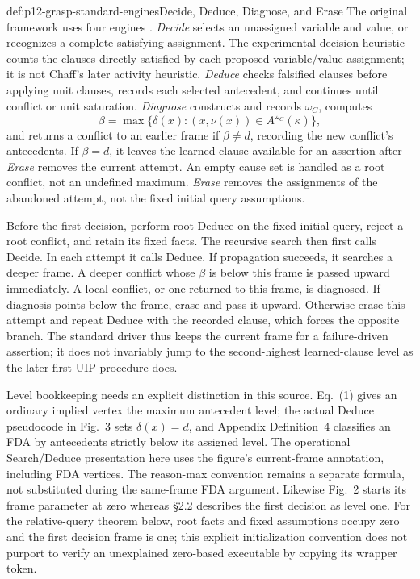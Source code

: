 \begin{hbmethod}{def:p12-grasp-standard-engines}{Decide, Deduce, Diagnose, and Erase}
The original framework uses four engines
\cite[Sec.~2.5; Figs.~2--3, 5]{MarquesSilvaSakallah1999}.
\emph{Decide} selects an unassigned variable and value, or recognizes a
complete satisfying assignment.  The experimental decision heuristic counts
the clauses directly satisfied by each proposed variable/value assignment;
it is not Chaff's later activity heuristic.  \emph{Deduce} checks falsified
clauses before applying unit clauses, records each selected antecedent, and
continues until conflict or unit saturation.  \emph{Diagnose} constructs and
records \(\omega_C\), computes
\[
 \beta=\max\{\delta(x):(x,\nu(x))\in A^{\omega_C}(\kappa)\},
\]
and returns a conflict to an earlier frame if \(\beta\ne d\), recording
the new conflict's antecedents.  If \(\beta=d\), it leaves the learned
clause available for an assertion after \emph{Erase} removes the current
attempt.  An empty cause set is handled as a root conflict, not an undefined
maximum.  \emph{Erase} removes the assignments of the abandoned attempt,
not the fixed initial query assumptions.

Before the first decision, perform root Deduce on the fixed initial query,
reject a root conflict, and retain its fixed facts.  The recursive search
then first calls Decide.  In each attempt it calls Deduce.
If propagation succeeds, it searches a deeper frame.  A deeper conflict whose
\(\beta\) is below this frame is passed upward immediately.  A local
conflict, or one returned to this frame, is diagnosed.  If diagnosis points
below the frame, erase and pass it upward.  Otherwise erase this attempt and
repeat Deduce with the recorded clause, which forces the opposite branch.
The standard driver thus keeps the current frame for a failure-driven
assertion; it does not invariably jump to the second-highest learned-clause
level as the later first-UIP procedure does.

Level bookkeeping needs an explicit distinction in this source.  Eq.~(1)
gives an ordinary implied vertex the maximum antecedent level; the actual
Deduce pseudocode in Fig.~3 sets \(\delta(x)=d\), and Appendix Definition~4
classifies an FDA by antecedents strictly below its assigned level.  The
operational Search/Deduce presentation here uses the figure's current-frame
annotation, including FDA vertices.  The reason-max convention remains a
separate formula, not substituted during the same-frame FDA argument.
Likewise Fig.~2 starts its frame parameter at zero whereas §2.2 describes the
first decision as level one.  For the relative-query theorem below, root
facts and fixed assumptions occupy zero and the first decision frame is one;
this explicit initialization convention does not purport to verify an
unexplained zero-based executable by copying its wrapper token.
\end{hbmethod}

